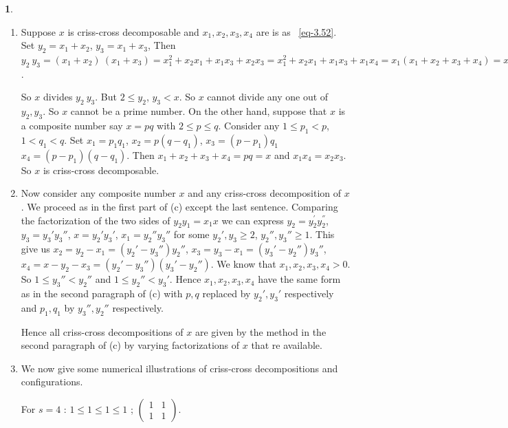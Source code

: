 \documentclass[a4paper,12pt]{article}
\theoremstyle{definition}
\theoremstyle{underlinethm}
\theoremstyle{definition}
\newtheorem{subsubsec}{}[subsection]
\begin{document}
\begin{subsubsec}
\begin{enumerate}[label=(\alph*)]
\item Suppose $x$ is criss-cross decomposable and $x_{1}, x_{2}, x_{3}, x_{4}$ are is as ~\eqref{eq-3.52}. Set $y_{2} =x_{1} + x_{2}$, $y_{3} =x_{1} +x_{3}$, Then $y_{2}~y_{3} = \left(x_{1} + x_{2}\right)~\left(x_{1} + x_{3}\right)= x_{1}^{2} + x_{2}x_{1} + x_{1} x_{3} + x_{2}x_{3} = x_{1}^{2} + x_{2}x_{1} +x_{1} x_{3} + x_{1} x_{4} = x_{1} \left(x_{1} + x_{2} + x_{3} + x_{4} \right)= x_{1} x$.  

So $x$ divides $y_{2}~y_{3}$. But $2 \leq y_{2}$, $y_{3} < x$. So $x$ cannot divide any one out of $y_{2}, y_{3}$. So $x$ cannot be a prime number. On the other hand, suppose that $x$ is a composite number say $x=pq$ with $2 \leq p \leq q$. Consider any $1 \leq p_{1} < p$, $1 < q_{1} < q$. Set $x_{1} = p_{1}q_{1}$, $x_{2} = p(q-q_{1})$, $x_{3} =(p-p_{1})q_{1}$ $x_{4} = (p-p_{1})(q-q_{1})$. Then $x_{1} + x_{2} + x_{3} + x_{4} = pq =x$ and $x_{1}x_{4} = x_{2}x_{3}$. So $x$ is criss-cross decomposable. 
 
\item Now consider any composite number $x$ and any criss-cross decomposition of $x$. We proceed as in the first part of (c) except the last sentence. Comparing the factorization of the two sides of $y_{2} y_{1} =x_{1} x$ we can express $y_{2}= y^{'}_{2} y_{2}^{''}$, $y_{3} = y_{3}' y_{3}''$, $x=y_{2}'y_{3}'$, $x_{1} =y_{2}'' y_{3}''$  for some $y_{2}', y_{3} \geq 2$, $y_{2}'', y_{3}'' \geq 1$. This give us $x_{2} = y_{2}-x_{1} =\left(y_{2}'-y_{3}''\right)y_{2}''$, $x_{3} =y_{3} -x_{1} =\left(y_{3}'-y_{2}''\right)y_{3}''$, $x_{4}=x-y_{2}-x_{3} = (y_{2}'-y_{3}'')(y_{3}'-y_{2}'')$.
 We know that $x_{1}, x_{2}, x_{3}, x_{4} > 0$. So $1 \leq y_{3}'' < y_{2}''$ and $1 \leq y_{2}'' < y_{3}'$. Hence $x_{1}, x_{2}, x_{3}, x_{4}$ have the same form as in the second paragraph of (c) with $p,q$ replaced by $y_{2}', y_{3}'$ respectively and $p_{1}, q_{1}$ by $y_{3}'', y_{2}''$ respectively.
 
 Hence all criss-cross decompositions of $x$ are given by the method in the second paragraph of (c) by varying factorizations of $x$ that re available.
 
\item We now give some numerical illustrations of criss-cross decompositions and configurations.

For $s=4$ : $1 \leq 1 \leq 1 \leq 1$  ; $\begin{pmatrix}1 & 1\\ 1 & 1\end{pmatrix}$.


\end{enumerate}
\end{subsubsec}
\end{document}
